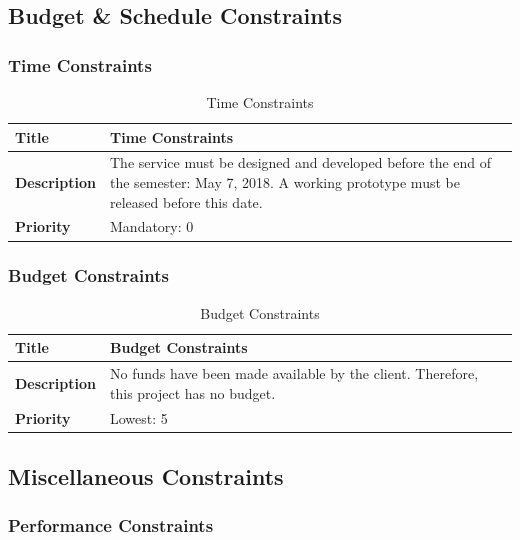 \documentclass{article}
\begin{document}
\subsection{Budget \& Schedule Constraints}

\subsubsection{Time Constraints}

\begin{table}[H]
	\caption{Time Constraints}
	\begin{tabularx}{\textwidth}{|l|X|}
		\hline
		\textbf{Title}       & Time Constraints                           \\ \hline
		\textbf{Description} & The service must be designed and developed before the end
			 of the semester: May 7, 2018. A working prototype must be released before
			this date.      \\ \hline
		\textbf{Priority}    & Mandatory: 0 \\ \hline
	\end{tabularx}
\end{table}

\subsubsection{Budget Constraints}

\begin{table}[H]
	\caption{Budget Constraints}
	\begin{tabularx}{\textwidth}{|l|X|}
		\hline
		\textbf{Title}       & Budget Constraints                           \\ \hline
		\textbf{Description} & No funds have been made available by the client. 
			Therefore, this project has no budget. \\ \hline
		\textbf{Priority}    & Lowest: 5 \\ \hline
	\end{tabularx}
\end{table}

\subsection{Miscellaneous Constraints}

\subsubsection{Performance Constraints}
\end{document}
